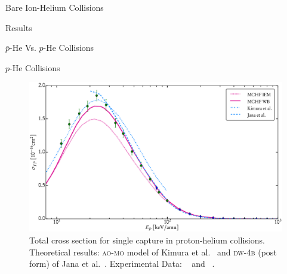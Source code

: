 \documentclass[letterpaper, 11 pt]{report}
\begin{document}
\begin{chapter}{Bare Ion-Helium Collisions \label{chap:p-he2p-he}}
\begin{section}{Results \label{sec:phe2p-res}}
\begin{subsection}{ \texorpdfstring{$\bar{p}$}{pbar}-He Vs. \texorpdfstring{$p$}{p}-He Collisions
                         \label{sec:pbarhe-res}}
      \end{subsection}

      \begin{subsection}{\texorpdfstring{$p$}{p}-He Collisions \label{sec:phe-res}}

         \begin{figure}[t]
            \centering
            \includegraphics[width = 0.95 \linewidth]{./images/phe/phe-TP.eps}
            \caption[Total cross section for single capture in proton-helium collisions.]
                    {Total cross section for single capture in proton-helium collisions.
                     Theoretical results: \textsc{ao-mo} model of Kimura et al.~\cite{KL-86} and
                     \textsc{dw-4b} (post form) of Jana et al.~\cite{JMP-15}. Experimental Data:
                     {\color{OliveGreen}{$\bullet$}}~\cite{SG89} and
                     {\color{blue}{$\blacklozenge$}}~\cite{SG85}. \label{fig:phe-tp}}
         \end{figure}


\end{subsection}
\end{section}
\end{chapter}
\end{document}
